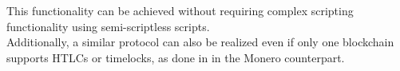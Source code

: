 \documentclass{article}      	%
\begin{document}
This functionality can be achieved without requiring complex scripting functionality \cite{h4sh3d} using semi-scriptless scripts. \\
Additionally, a similar protocol can also be realized even if only one blockchain supports HTLCs or timelocks, as done in \cite{h4sh3d} in the Monero counterpart.


\end{document}
